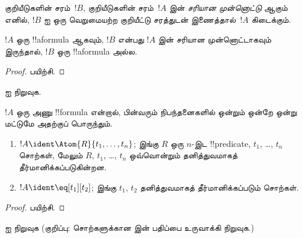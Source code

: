 \documentclass[../../../include/open-logic-section]{subfiles}
\begin{document}
\begin{defn}[சரியான முன்னொட்டு]
குறியீடுகளின் சரம்~$!B$, குறியீடுகளின் சரம்~$!A$ இன் \emph{சரியான
முன்னொட்டு} ஆகும் எனில், $!B$ ஐ ஒரு வெறுமையற்ற குறியீட்டு சரத்துடன்
இணைத்தால்~$!A$ கிடைக்கும்.
\end{defn}

\begin{lem}
$!A$ ஒரு !!a{formula} ஆகவும், $!B$ என்பது $!A$ இன் சரியான முன்னொட்டாகவும்
இருந்தால், $!B$ ஒரு !!a{formula} அல்ல.
\end{lem}

\begin{proof}
பயிற்சி.
\end{proof}

\begin{prob}
 ஐ நிறுவுக.
\end{prob}

\begin{prop}
$!A$ ஒரு அணு !!{formula} என்றால், பின்வரும் நிபந்தனைகளில் ஒன்றும் ஒன்றே
ஒன்று மட்டுமே அதற்குப் பொருந்தும்.
\begin{enumerate}
\item $!A \ident \Atom{R}{t_1,\dots,t_n}$; இங்கு $R$ ஒரு $n$-இட
  !!{predicate}, $t_1$, \dots, $t_n$ சொற்கள், மேலும் $R$, $t_1$, \dots,
  $t_n$ ஒவ்வொன்றும் தனித்துவமாகத் தீர்மானிக்கப்படுகின்றன.
\item $!A \ident \eq[t_1][t_2]$; இங்கு $t_1$, $t_2$ தனித்துவமாகத்
  தீர்மானிக்கப்படும் சொற்கள்.
\end{enumerate}
\end{prop}

\begin{proof}
பயிற்சி.
\end{proof}

\begin{prob}
 ஐ நிறுவுக (குறிப்பு:
சொற்களுக்கான  இன் பதிப்பை
உருவாக்கி நிறுவுக.)
\end{prob}
\end{document}
